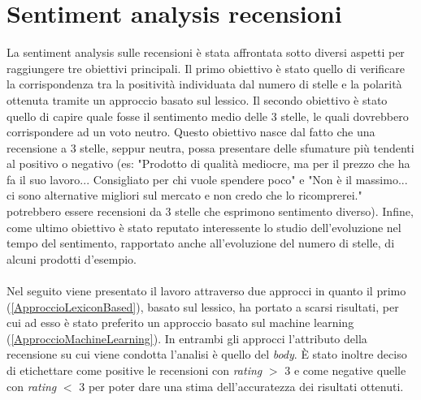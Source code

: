 \section{Sentiment analysis recensioni}\label{SentimentAnalysis}
La sentiment analysis sulle recensioni è stata affrontata sotto diversi aspetti per raggiungere tre obiettivi principali. Il primo obiettivo è stato quello di verificare la corrispondenza tra la positività individuata dal numero di stelle e la polarità ottenuta tramite un approccio basato sul lessico. Il secondo obiettivo è stato quello di capire quale fosse il sentimento medio delle 3 stelle, le quali dovrebbero corrispondere ad un voto neutro. Questo obiettivo nasce dal fatto che una recensione a 3 stelle, seppur neutra, possa presentare delle sfumature più tendenti al positivo o negativo (es: "Prodotto di qualità mediocre, ma per il prezzo che ha fa il suo lavoro... Consigliato per chi vuole spendere poco" e "Non è il massimo... ci sono alternative migliori sul mercato e non credo che lo ricomprerei." potrebbero essere recensioni da 3 stelle che esprimono sentimento diverso). Infine, come ultimo obiettivo è stato reputato interessente lo studio dell'evoluzione nel tempo del sentimento, rapportato anche all'evoluzione del numero di stelle, di alcuni prodotti d'esempio. 
\\\\
Nel seguito viene presentato il lavoro attraverso due approcci in quanto il primo (\ref{ApproccioLexiconBased}), basato sul lessico, ha portato a scarsi risultati, per cui ad esso è stato preferito un approccio basato sul machine learning (\ref{ApproccioMachineLearning}).
In entrambi gli approcci l'attributo della recensione su cui viene condotta l'analisi è quello del \textit{body}. È stato inoltre deciso di etichettare come positive le recensioni con \textit{rating} $>$ 3 e come negative quelle con \textit{rating} $<$ 3 per poter dare una stima dell'accuratezza dei risultati ottenuti.


